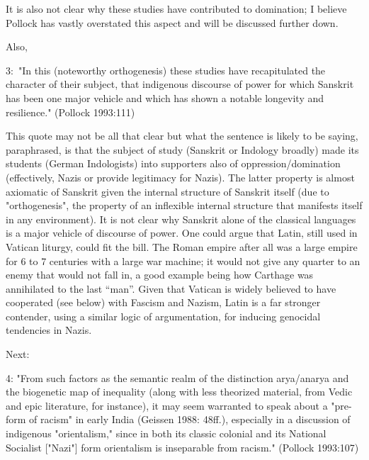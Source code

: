 {\begin{enumerate}
It is also not clear why these studies have contributed to domination; I believe Pollock has vastly overstated this aspect and will be discussed further down.

Also, 
\begin{myquote}
3:~"In this (noteworthy orthogenesis) these studies have recapitulated the character of their subject, that indigenous discourse of power for which Sanskrit has been one major vehicle and which has shown a notable longevity and resilience." \hfill(Pollock 1993:111)
\end{myquote}
\smallskip

This quote may not be all that clear but what the sentence is likely to be saying, paraphrased, is that the subject of study (Sanskrit or Indology broadly) made its students (German Indologists) into supporters also of oppression/domination (effectively, Nazis or provide legitimacy for Nazis). The latter property is almost axiomatic of Sanskrit given the internal structure of Sanskrit itself (due to "orthogenesis", the property of an inflexible internal structure that manifests itself in any environment). It is not clear why Sanskrit alone of the classical languages is a major vehicle of discourse of power. One could argue that Latin, still used in Vatican liturgy, could fit the bill. The Roman empire after all was a large empire for 6 to 7 centuries with a large war machine; it would not give any quarter to an enemy that would not fall in, a good example being how Carthage was annihilated to the last “man”. Given that Vatican is widely believed to have cooperated (see below) with Fascism and Nazism, Latin is a far stronger contender, using a similar logic of argumentation, for inducing genocidal tendencies in Nazis.

Next: 
\begin{myquote}
4: "From such factors as the semantic realm of the distinction arya/anarya and the biogenetic map of inequality (along with less theorized material, from Vedic and epic literature, for instance), it may seem warranted to speak about a "pre-form of racism" in early India (Geissen 1988: 48ff.), especially in a discussion of indigenous "orientalism," since in both its classic colonial and its National Socialist ["Nazi"] form orientalism is inseparable from racism."  \hfill(Pollock 1993:107)
\end{myquote}
\medskip


\end{enumerate}}
